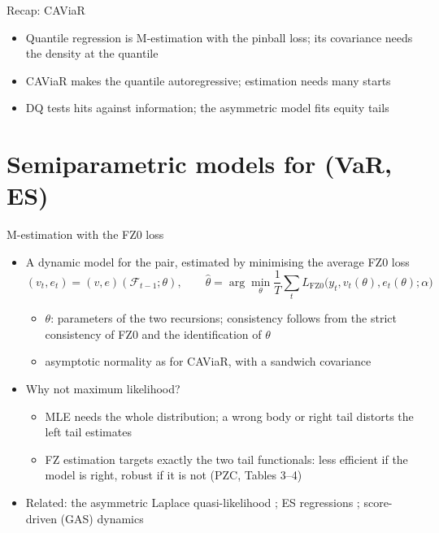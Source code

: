 \begin{frame}{Recap: CAViaR}
\itemsize{\small}
\begin{itemize}
    \item Quantile regression is M-estimation with the pinball loss; its covariance needs the density at the quantile
    \item CAViaR makes the quantile autoregressive; estimation needs many starts
    \item DQ tests hits against information; the asymmetric model fits equity tails
\end{itemize}
\end{frame}


\section{Semiparametric models for (VaR, ES)}

\begin{frame}{M-estimation with the FZ0 loss}
\itemsize{\small}
\begin{itemize}
    \item A dynamic model for the pair, estimated by minimising the average FZ0 loss 
    \[ (v_t, e_t) = (v, e)(\mathcal F_{t-1}; \theta), \qquad \hat\theta = \arg\min_\theta \frac1T\sum_t L_{\mathrm{FZ0}}\big(y_t, v_t(\theta), e_t(\theta); \alpha\big) \]
    \begin{itemize}
        \item $\theta$: parameters of the two recursions; consistency follows from the strict consistency of FZ0 and the identification of $\theta$
        \item asymptotic normality as for CAViaR, with a sandwich covariance
    \end{itemize}
    \item Why not maximum likelihood?
    \begin{itemize}
        \item MLE needs the whole distribution; a wrong body or right tail distorts the left tail estimates
        \item FZ estimation targets exactly the two tail functionals: less efficient if the model is right, robust if it is not (PZC, Tables 3--4)
    \end{itemize}
    \item Related: the asymmetric Laplace quasi-likelihood ; ES regressions ; score-driven (GAS) dynamics 
\end{itemize}
\end{frame}

